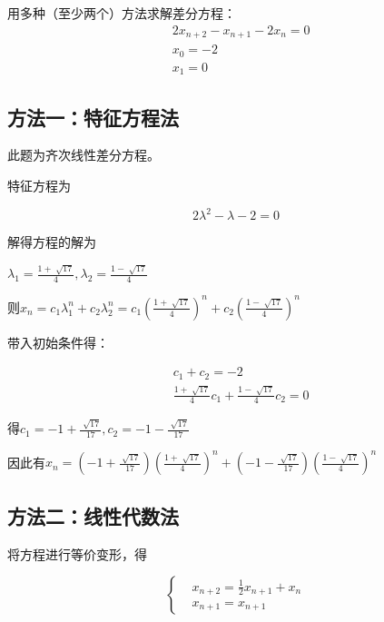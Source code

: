 \chapter{}

用多种（至少两个）方法求解差分方程：
\begin{equation*}
    \begin{split}
        &2x_{n+2} - x_{n+1} - 2x_n = 0\\
        &x_0 = -2\\
        &x_1 = 0
    \end{split}
\end{equation*}
\section{方法一：特征方程法}
此题为齐次线性差分方程。

特征方程为

\begin{equation}
    2\lambda^2-\lambda-2=0
\end{equation}

解得方程的解为

$\lambda_1 = \frac{1+\sqrt[]{17}}{4}, \lambda_2 = \frac{1-\sqrt[]{17}}{4} $

则$x_n=c_1\lambda_1^n + c_2\lambda_2^n = c_1(\frac{1+\sqrt[]{17}}{4})^n + c_2(\frac{1-\sqrt[]{17}}{4})^n$


带入初始条件得：

\begin{equation}
    \begin{aligned}
        &c_1+c_2=-2\\
        &\frac{1+\sqrt[]{17}}{4}c_1 + \frac{1-\sqrt[]{17}}{4}c_2 = 0
    \end{aligned}
\end{equation}

得$c_1=-1+\frac{\sqrt[]{17}}{17}, c_2=-1-\frac{\sqrt[]{17}}{17}$

因此有$x_n = (-1+\frac{\sqrt[]{17}}{17})(\frac{1+\sqrt[]{17}}{4})^n+(-1-\frac{\sqrt[]{17}}{17})( \frac{1-\sqrt[]{17}}{4} )^n$


\section{方法二：线性代数法}

将方程进行等价变形，得

\begin{equation}
    \left \{
        \begin{aligned}
        &x_{n+2} = \frac{1}{2}x_{n+1} + x_n\\
        &x_{n+1} = x_{n+1}
        \end{aligned}
    \right .
\end{equation}


